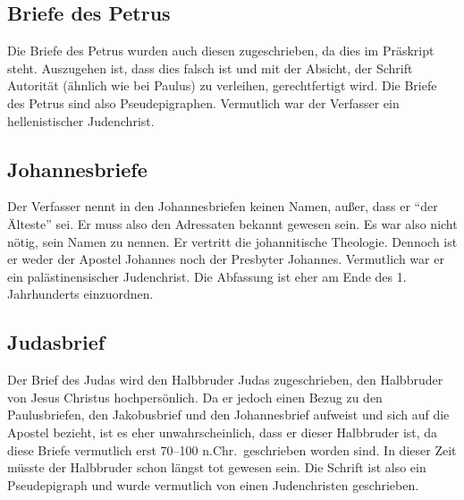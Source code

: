 \subsection*{Briefe des Petrus}
Die Briefe des Petrus wurden auch diesen zugeschrieben, da dies im Präskript steht. Auszugehen ist, dass dies falsch ist und mit der Absicht, der Schrift Autorität (ähnlich wie bei Paulus) zu verleihen, gerechtfertigt wird. Die Briefe des Petrus sind also Pseudepigraphen. Vermutlich war der Verfasser ein hellenistischer Judenchrist.

\subsection*{Johannesbriefe}
Der Verfasser nennt in den Johannesbriefen keinen Namen, außer, dass er ``der Älteste'' sei. Er muss also den Adressaten bekannt gewesen sein. Es war also nicht nötig, sein Namen zu nennen. Er vertritt die johannitische Theologie. Dennoch ist er weder der Apostel Johannes noch der Presbyter Johannes. Vermutlich war er ein palästinensischer Judenchrist. Die Abfassung ist eher am Ende des 1. Jahrhunderts einzuordnen.

\subsection*{Judasbrief}
Der Brief des Judas wird den Halbbruder Judas zugeschrieben, den Halbbruder von Jesus Christus hochpersönlich. Da er jedoch einen Bezug zu den Paulusbriefen, den Jakobusbrief und den Johannesbrief aufweist und sich auf die Apostel bezieht, ist es eher unwahrscheinlich, dass er dieser Halbbruder ist, da diese Briefe vermutlich erst  70--100 n.Chr.\ geschrieben worden sind. In dieser Zeit müsste der Halbbruder schon längst tot gewesen sein. Die Schrift ist also ein Pseudepigraph und wurde vermutlich von einen Judenchristen geschrieben.

